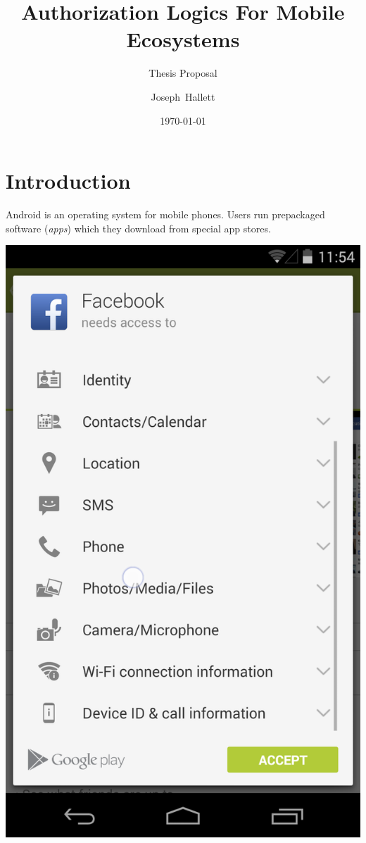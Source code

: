 \documentclass[a4paper,sfsidenotes]{%
  scrartcl%
}
\title{Authorization Logics For Mobile Ecosystems}%
\subtitle{Thesis Proposal}
\author{Joseph~Hallett}
\date\today
\begin{document}
\frenchspacing
\begin{titlepage}
\maketitle
\end{titlepage}
\pagebreak
\setcounter{tocdepth}{3}
\tableofcontents
\pagebreak
\listoffigures
\pagebreak

\section{Introduction}
\label{sec:intro}

Android is an operating system for mobile phones.  Users run prepackaged
software (\emph{apps}) which they download from special app stores.

\begin{marginfigure}
  \includegraphics[width=\smallmarginlength]{img/facebookperms2.png}
  \caption[Permissions requested by the Facebook app on Android.]{%
    Permissions requested by the Facebook app on Android.
  When installing an app a user is presented with a list of permissions the app
  requires to run.  Permissions describe what phone features an app will have
  access to.}
  \label{fig:fb}
\end{marginfigure}
\end{document}
